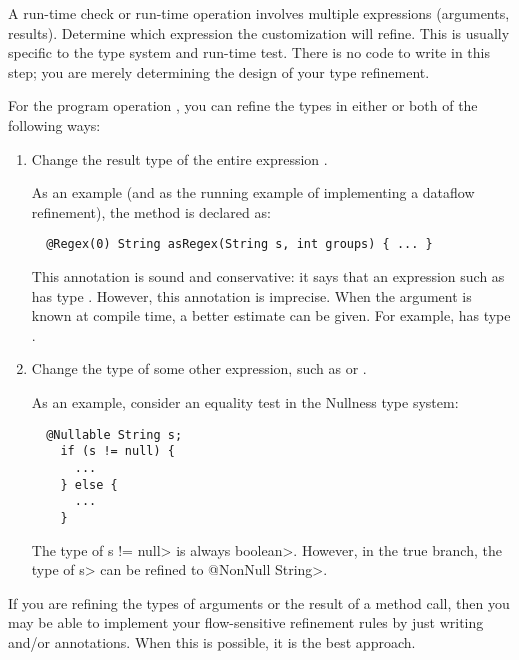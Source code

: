 
A run-time check or run-time
operation involves multiple expressions (arguments, results).
Determine which expression the customization will refine.  This is
usually specific to the type system and run-time test.
There is no code to write in this step; you are merely determining
the design of your type refinement.

For the program operation , you can refine
the types in either or both of the following ways:
\begin{enumerate}
\item Change the result type of the entire expression .

As an example (and as the running example of implementing a dataflow
refinement), the  method is declared as:

\begin{smaller}
\begin{Verbatim}
  @Regex(0) String asRegex(String s, int groups) { ... }
\end{Verbatim}
\end{smaller}

\noindent
This annotation is sound and conservative:  it says that an expression such
as  has type .  However, this annotation is imprecise.  When the 
argument is known at compile time, a better estimate can be given.  For
example,  has type .

\item Change the type of some other expression, such as  or .

As an example, consider an equality test in the Nullness type system:

\begin{Verbatim}
  @Nullable String s;
    if (s != null) {
      ...
    } else {
      ...
    }
\end{Verbatim}

The type of \<s != null> is always \<boolean>.  However, in the
true branch, the type of \<s> can be refined to \<@NonNull String>.

\end{enumerate}

If you are refining the types of arguments or the result of a method call,
then you may be able to implement your flow-sensitive refinement rules by
just writing  and/or
 annotations.
When this is possible, it is the best approach.

